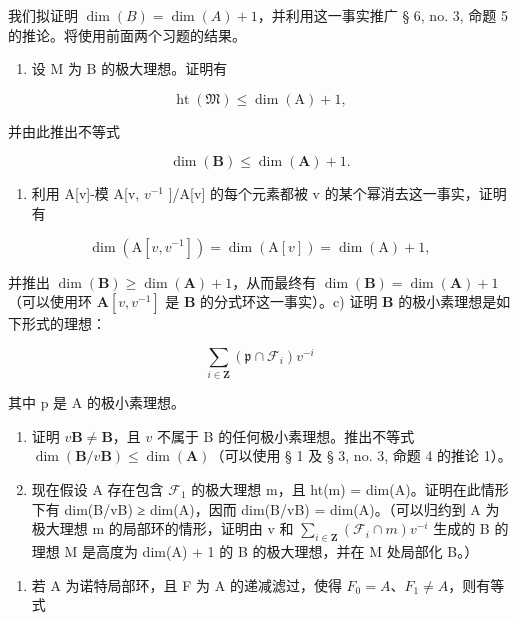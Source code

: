 我们拟证明 \(\dim(B) = \dim(A) + 1\)，并利用这一事实推广 § 6, no. 3, 命题 5 的推论。将使用前面两个习题的结果。

\begin{enumerate}
\def\labelenumi{\alph{enumi})}
\tightlist
\item
  设 M 为 B 的极大理想。证明有
\end{enumerate}

\[
\operatorname{ht} (\mathfrak {M}) \leqslant \dim (\mathrm{A}) + 1,
\]

并由此推出不等式

\[
\dim (\mathbf {B}) \leqslant \dim (\mathbf {A}) + 1.
\]

\begin{enumerate}
\def\labelenumi{\alph{enumi})}
\setcounter{enumi}{1}
\tightlist
\item
  利用 A{[}v{]}-模 A{[}v, \(v^{-1}\) {]}/A{[}v{]} 的每个元素都被 v 的某个幂消去这一事实，证明有
\end{enumerate}

\[
\dim (\mathrm{A} [ v, v ^ {- 1} ]) = \dim (\mathrm{A} [ v ]) = \dim (\mathrm{A}) + 1,
\]

并推出 \(\dim(\mathbf{B}) \geqslant \dim(\mathbf{A}) + 1\)，从而最终有 \(\dim(\mathbf{B}) = \dim(\mathbf{A}) + 1\)（可以使用环 \(\mathbf{A}[v, v^{-1}]\) 是 \(\mathbf{B}\) 的分式环这一事实）。c) 证明 \(\mathbf{B}\) 的极小素理想是如下形式的理想：

\[
\sum_ {i \in \mathbf {Z}} \left(\mathfrak {p} \cap \mathcal {F} _ {i}\right) v ^ {- i}
\]

其中 p 是 A 的极小素理想。

\begin{enumerate}
\def\labelenumi{\alph{enumi})}
\setcounter{enumi}{3}
\item
  证明 \(v\mathbf{B} \neq \mathbf{B}\)，且 \(v\) 不属于 B 的任何极小素理想。推出不等式 \(\dim(\mathbf{B}/v\mathbf{B}) \leqslant \dim(\mathbf{A})\)（可以使用 § 1 及 § 3, no. 3, 命题 4 的推论 1）。
\item
  现在假设 A 存在包含 \(\mathcal{F}_1\) 的极大理想 m，且 ht(m) = dim(A)。证明在此情形下有 dim(B/vB) ≥ dim(A)，因而 dim(B/vB) = dim(A)。（可以归约到 A 为极大理想 m 的局部环的情形，证明由 v 和 \(\sum_{i\in\mathbf{Z}}(\mathcal{F}_i\cap m)v^{-i}\) 生成的 B 的理想 M 是高度为 dim(A) + 1 的 B 的极大理想，并在 M 处局部化 B。）
\end{enumerate}





\begin{enumerate}
\def\labelenumi{\alph{enumi})}
\setcounter{enumi}{5}
\tightlist
\item
  若 A 为诺特局部环，且 F 为 A 的递减滤过，使得 \(F_{0} = A\)、\(F_{1} \neq A\)，则有等式
\end{enumerate}

